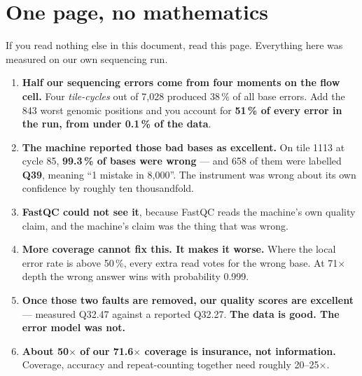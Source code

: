 \clearpage
\renewcommand{\sectioncolor}{lab}
\section{One page, no mathematics}

If you read nothing else in this document, read this page. Everything here was measured on our own
sequencing run.

\begin{labbox}[title={What we found}]
\begin{enumerate}[label=\textbf{\arabic*.},leftmargin=1.7em]
\item \textbf{Half our sequencing errors come from four moments on the flow cell.}
  Four \emph{tile-cycles} out of 7{,}028 produced 38\,\% of all base errors. Add the 843 worst
  genomic positions and you account for \textbf{51\,\% of every error in the run, from under 0.1\,\%
  of the data}.
\item \textbf{The machine reported those bad bases as excellent.} On tile 1113 at cycle 85,
  \textbf{99.3\,\% of bases were wrong} --- and 658 of them were labelled \textbf{Q39}, meaning
  ``1 mistake in 8{,}000''. The instrument was wrong about its own confidence by roughly ten
  thousandfold.
\item \textbf{FastQC could not see it}, because FastQC reads the machine's own quality claim, and the
  machine's claim was the thing that was wrong.
\item \textbf{More coverage cannot fix this. It makes it worse.} Where the local error rate is above
  50\,\%, every extra read votes for the wrong base. At 71$\times$ depth the wrong answer wins with
  probability 0.999.
\item \textbf{Once those two faults are removed, our quality scores are excellent}
  --- measured Q32.47 against a reported Q32.27. \textbf{The data is good. The error model was not.}
\item \textbf{About 50$\times$ of our 71.6$\times$ coverage is insurance, not information.} Coverage,
  accuracy and repeat-counting together need roughly 20--25$\times$.
\end{enumerate}
\end{labbox}

